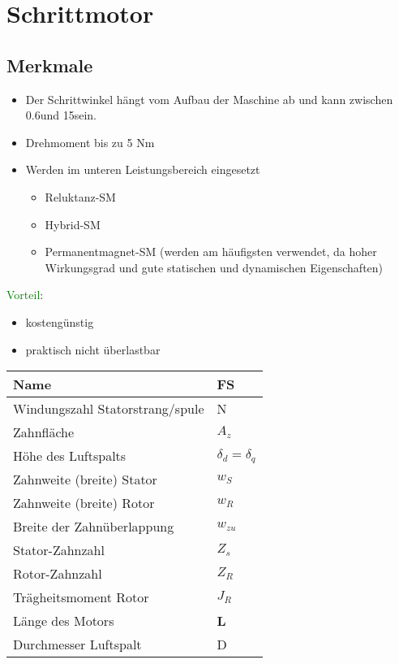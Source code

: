 \section{Schrittmotor}
\subsection{Merkmale}
    \begin{itemize}
        \item Der Schrittwinkel hängt vom Aufbau der Maschine ab und kann zwischen 0.6\textdegree  und 15\textdegree  sein.
        \item Drehmoment bis zu 5 Nm
        \item Werden im unteren Leistungsbereich eingesetzt
        \begin{itemize}
            \item Reluktanz-SM
            \item Hybrid-SM
            \item Permanentmagnet-SM (werden am häufigsten verwendet, da hoher Wirkungsgrad und gute statischen und dynamischen Eigenschaften)
        \end{itemize}
    \end{itemize}
    \textcolor{green}{Vorteil}:
    \begin{itemize}
        \item kostengünstig
        \item praktisch nicht überlastbar
    \end{itemize}
    \renewcommand{\arraystretch}{2}
    \begin{tabularx}{0.43\linewidth}{|X|l|}
        \hline 
        \textbf{Name}&\textbf{FS} \\
        \hline
        Windungszahl Statorstrang/spule&N  \\ 
        \hline 
        Zahnfläche&$ A_z $  \\ 
        \hline
        Höhe des Luftspalts& $ \delta_{d} = \delta_{q}$ \\ 
        \hline 
        Zahnweite (breite) Stator& $ w_S $  \\ 
        \hline
        Zahnweite (breite) Rotor& $ w_R $ \\
        \hline 
        Breite der Zahnüberlappung&  $ w_{zu} $ \\ 
        \hline
        Stator-Zahnzahl& $  Z_s $\\
        \hline
        Rotor-Zahnzahl&$ Z_R $ \\
        \hline 
        Trägheitsmoment Rotor& $ J_R $ \\
        \hline
        Länge des Motors&\textbf{L} \\
        \hline
        Durchmesser Luftspalt&D\\
        \hline                                    
    \end{tabularx}
